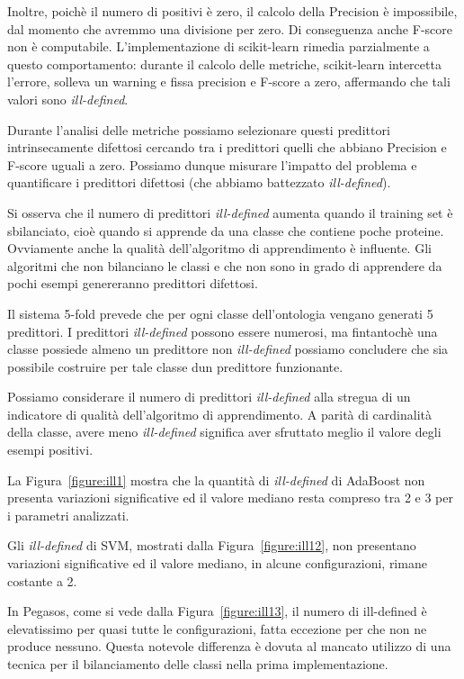 \documentclass[12pt,a4paper,oneside,hidelinks]{report}
\begin{document}
Inoltre, poichè il numero di positivi è zero, il calcolo della Precision è impossibile, dal momento che avremmo una divisione per zero. Di conseguenza anche F-score non è computabile. L'implementazione di scikit-learn rimedia parzialmente a questo comportamento: durante il calcolo delle metriche, scikit-learn intercetta l'errore, solleva un warning e fissa precision e F-score a zero, affermando che tali valori sono \emph{ill-defined}.

Durante l'analisi delle metriche possiamo selezionare questi predittori intrinsecamente difettosi cercando tra i predittori quelli che abbiano Precision e F-score uguali a zero. Possiamo dunque misurare l'impatto del problema e quantificare i predittori difettosi (che abbiamo battezzato  \emph{ill-defined}).

Si osserva che il numero di predittori \emph{ill-defined} aumenta quando il training set è sbilanciato, cioè quando si apprende da una classe che contiene poche proteine. Ovviamente anche la qualità dell'algoritmo di apprendimento è influente. Gli algoritmi che non bilanciano le classi e che non sono in grado di apprendere da pochi esempi genereranno predittori difettosi.

Il sistema 5-fold prevede che per ogni classe dell'ontologia vengano generati 5 predittori. I predittori \emph{ill-defined} possono essere numerosi, ma fintantochè una classe possiede almeno un predittore non \emph{ill-defined} possiamo concludere che sia possibile costruire per tale classe dun predittore funzionante.

Possiamo considerare il numero di predittori \emph{ill-defined} alla stregua di un indicatore di qualità dell'algoritmo di apprendimento. A parità di cardinalità della classe, avere meno \emph{ill-defined} significa aver sfruttato meglio il valore degli esempi positivi.

La Figura~\ref{figure:ill1} mostra che la quantità di \emph{ill-defined} di AdaBoost non presenta variazioni significative ed il valore mediano resta compreso tra 2 e 3 per i parametri analizzati.

Gli \emph{ill-defined} di SVM, mostrati dalla Figura~\ref{figure:ill12}, non presentano variazioni significative ed il valore mediano, in alcune configurazioni, rimane costante a 2.

In Pegasos, come si vede dalla Figura~\ref{figure:ill13}, il numero di ill-defined è elevatissimo per quasi tutte le configurazioni, fatta eccezione per  che non ne produce nessuno. Questa notevole differenza è dovuta al mancato utilizzo di una tecnica per il bilanciamento delle classi nella prima implementazione.
\end{document}
